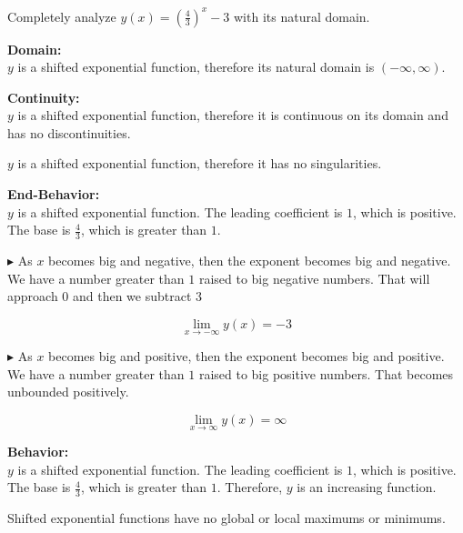 \documentclass{ximera}
\author{Lee Wayand}
\begin{document}
\begin{exercise}



Completely analyze $y(x) = \left(\frac{4}{3}\right)^x - 3$ with its natural domain.



\textbf{\textcolor{blue!55!black}{Domain:}}  \\

$y$ is a shifted exponential function, therefore its natural domain is $(-\infty, \infty)$.




\textbf{\textcolor{blue!55!black}{Continuity:}}  \\

$y$ is a shifted exponential function, therefore it is continuous on its domain and has no discontinuities.


$y$ is a shifted exponential function, therefore it has no singularities.




\textbf{\textcolor{blue!55!black}{End-Behavior:}}  \\



$y$ is a shifted exponential function. The leading coefficient is $1$, which is positive.  The base is $\frac{4}{3}$, which is greater than $1$.  


$\blacktriangleright$ As $x$ becomes big and negative, then the exponent becomes big and negative.  We have a number greater than $1$ raised to big negative numbers.  That will approach $0$ and then we subtract $3$

\[
\lim\limits_{x \to -\infty} y(x) = -3
\]


$\blacktriangleright$ As $x$ becomes big and positive, then the exponent becomes big and positive.  We have a number greater than $1$ raised to big positive numbers. That becomes unbounded positively.

\[
\lim\limits_{x \to \infty} y(x) = \infty
\]




\textbf{\textcolor{blue!55!black}{Behavior:}}  \\

$y$ is a shifted exponential function. The leading coefficient is $1$, which is positive.  The base is $\frac{4}{3}$, which is greater than $1$.  Therefore, $y$ is an increasing function.

Shifted exponential functions have no global or local maximums or minimums.





\end{exercise}
\end{document}
